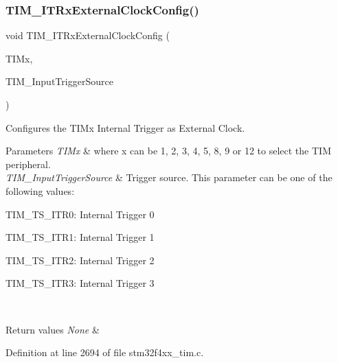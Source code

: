 \subsubsection{\texorpdfstring{T\+I\+M\+\_\+\+I\+T\+Rx\+External\+Clock\+Config()}{TIM\_ITRxExternalClockConfig()}}
{\footnotesize\ttfamily void T\+I\+M\+\_\+\+I\+T\+Rx\+External\+Clock\+Config (\begin{DoxyParamCaption}\item[{\hyperlink{struct_t_i_m___type_def}{T\+I\+M\+\_\+\+Type\+Def} $\ast$}]{T\+I\+Mx,  }\item[{uint16\+\_\+t}]{T\+I\+M\+\_\+\+Input\+Trigger\+Source }\end{DoxyParamCaption})}



Configures the T\+I\+Mx Internal Trigger as External Clock. 


\begin{DoxyParams}{Parameters}
{\em T\+I\+Mx} & where x can be 1, 2, 3, 4, 5, 8, 9 or 12 to select the T\+IM peripheral. \\
\hline
{\em T\+I\+M\+\_\+\+Input\+Trigger\+Source} & Trigger source. This parameter can be one of the following values\+: \begin{DoxyItemize}
\item T\+I\+M\+\_\+\+T\+S\+\_\+\+I\+T\+R0\+: Internal Trigger 0 \item T\+I\+M\+\_\+\+T\+S\+\_\+\+I\+T\+R1\+: Internal Trigger 1 \item T\+I\+M\+\_\+\+T\+S\+\_\+\+I\+T\+R2\+: Internal Trigger 2 \item T\+I\+M\+\_\+\+T\+S\+\_\+\+I\+T\+R3\+: Internal Trigger 3 \end{DoxyItemize}
\\
\hline
\end{DoxyParams}

\begin{DoxyRetVals}{Return values}
{\em None} & \\
\hline
\end{DoxyRetVals}


Definition at line 2694 of file stm32f4xx\+\_\+tim.\+c.

\mbox{\label{group___t_i_m___group6_gaf460e7d9c9969044e364130e209937fc}} 
